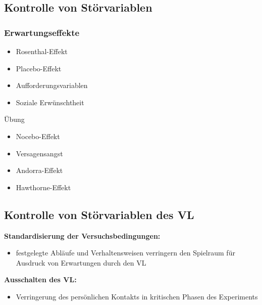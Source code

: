 \documentclass[
]{book}
\providecommand{\tightlist}{%
  \setlength{\itemsep}{0pt}\setlength{\parskip}{0pt}}
\begin{document}
\hypertarget{kontrolle-von-stuxf6rvariablen}{%
\subsection{Kontrolle von Störvariablen}\label{kontrolle-von-stuxf6rvariablen}}

\hypertarget{erwartungseffekte}{%
\subsubsection{Erwartungseffekte}\label{erwartungseffekte}}

\begin{itemize}
\item
  Rosenthal-Effekt
\item
  Placebo-Effekt
\item
  Aufforderungsvariablen
\item
  Soziale Erwünschtheit
\end{itemize}

Übung

\begin{itemize}
\item
  Nocebo-Effekt
\item
  Versagensangst
\item
  Andorra-Effekt
\item
  Hawthorne-Effekt
\end{itemize}

\hypertarget{kontrolle-von-stuxf6rvariablen-des-vl}{%
\subsection{Kontrolle von Störvariablen des VL}\label{kontrolle-von-stuxf6rvariablen-des-vl}}

\textbf{Standardisierung der Versuchsbedingungen:}

\begin{itemize}
\tightlist
\item
  festgelegte Abläufe und Verhaltensweisen verringern den Spielraum für Ausdruck von Erwartungen durch den VL
\end{itemize}

\textbf{Ausschalten des VL:}

\begin{itemize}
\tightlist
\item
  Verringerung des persönlichen Kontakts in kritischen Phasen des Experiments
\end{itemize}
\end{document}
